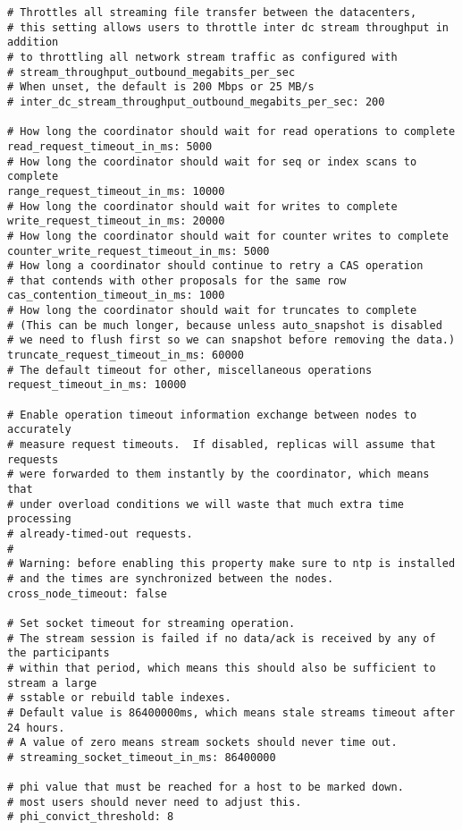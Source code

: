 \begin{verbatim}
# Throttles all streaming file transfer between the datacenters,
# this setting allows users to throttle inter dc stream throughput in addition
# to throttling all network stream traffic as configured with
# stream_throughput_outbound_megabits_per_sec
# When unset, the default is 200 Mbps or 25 MB/s
# inter_dc_stream_throughput_outbound_megabits_per_sec: 200

# How long the coordinator should wait for read operations to complete
read_request_timeout_in_ms: 5000
# How long the coordinator should wait for seq or index scans to complete
range_request_timeout_in_ms: 10000
# How long the coordinator should wait for writes to complete
write_request_timeout_in_ms: 20000
# How long the coordinator should wait for counter writes to complete
counter_write_request_timeout_in_ms: 5000
# How long a coordinator should continue to retry a CAS operation
# that contends with other proposals for the same row
cas_contention_timeout_in_ms: 1000
# How long the coordinator should wait for truncates to complete
# (This can be much longer, because unless auto_snapshot is disabled
# we need to flush first so we can snapshot before removing the data.)
truncate_request_timeout_in_ms: 60000
# The default timeout for other, miscellaneous operations
request_timeout_in_ms: 10000

# Enable operation timeout information exchange between nodes to accurately
# measure request timeouts.  If disabled, replicas will assume that requests
# were forwarded to them instantly by the coordinator, which means that
# under overload conditions we will waste that much extra time processing 
# already-timed-out requests.
#
# Warning: before enabling this property make sure to ntp is installed
# and the times are synchronized between the nodes.
cross_node_timeout: false

# Set socket timeout for streaming operation.
# The stream session is failed if no data/ack is received by any of the participants
# within that period, which means this should also be sufficient to stream a large
# sstable or rebuild table indexes.
# Default value is 86400000ms, which means stale streams timeout after 24 hours.
# A value of zero means stream sockets should never time out.
# streaming_socket_timeout_in_ms: 86400000

# phi value that must be reached for a host to be marked down.
# most users should never need to adjust this.
# phi_convict_threshold: 8


\end{verbatim}

